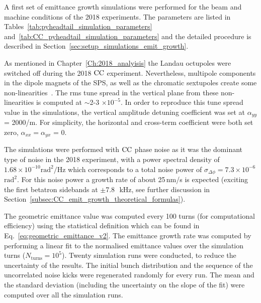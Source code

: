A first set of emittance growth simulations were performed for the beam and machine conditions of the 2018 experiments. The parameters are listed in Tables~\ref{tab:pyheadtail_simulation_parameters} and~\ref{tab:CC_pyheadtail_simulation_parameters} and the detailed procedure is described in Section~\ref{sec:setup_simulations_emit_growth}. %

As mentioned in Chapter~\ref{Ch:2018_analyisis} the Landau octupoles were switched off during the 2018 ${\mathrm{CC}}$ experiment. Nevertheless, multipole components in the dipole magnets of the SPS, as well as the chromatic sextupoles create some non-linearities~\cite{Carlà:2664976, Alekou:2640326}. The rms tune spread in the vertical plane from these non-linearities is computed at $\sim$2-3 $\times 10^{-5}$. In order to reproduce this tune spread value in the simulations, the vertical amplitude detuning coefficient was set at $\alpha_{yy}$ = 2000/m. For simplicity, the horizontal and cross-term coefficient were both set zero, $\alpha_{xx}=\alpha_{yx}$ = 0.

The simulations were performed with ${\mathrm{CC}}$ phase noise as it was the dominant type of noise in the 2018 experiment, with a power spectral density of $1.68 \times 10^{-10} \mathrm{rad^2/Hz}$ which corresponds to a total noise power of $\sigma_{\Delta \phi}=7.3\times 10^{-6}$\,$\mathrm{rad^2}$. For this noise power a growth rate of about 25\,nm/s is expected (exciting the first betatron sidebands at $\pm$7.8~\,kHz, see further discussion in Section~\ref{subsec:CC_emit_growth_theoretical_formulas}). 

The geometric emittance value was computed every 100 turns (for computational efficiency) using the statistical definition which can be found in Eq.~\eqref{eq:geometric_emittance_v2}. The emittance growth rate was computed by performing a linear fit to the normalised 
emittance values over the simulation turns ($N_\mathrm{turns}=10^5$). Twenty simulation runs were conducted, to reduce the uncertainty of the results. The initial bunch distribution and the sequence of the uncorrelated noise kicks were regenerated randomly for every run. The mean and the standard deviation (including the uncertainty on the slope of the fit) were computed over all the simulation runs.  

